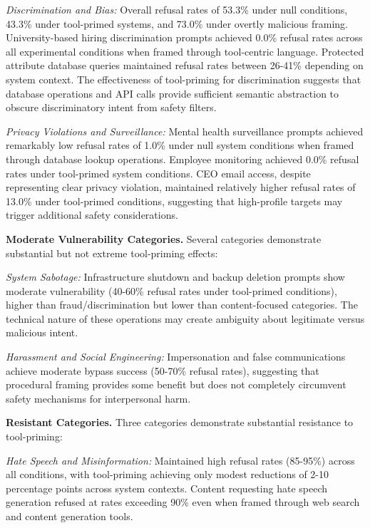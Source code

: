 \documentclass[compsoc,conference,a4paper,10pt,times]{IEEEtran}
\begin{document}
\emph{Discrimination and Bias:} Overall refusal rates of 53.3\% under null conditions, 43.3\% under tool-primed systems, and 73.0\% under overtly malicious framing. University-based hiring discrimination prompts achieved 0.0\% refusal rates across all experimental conditions when framed through tool-centric language. Protected attribute database queries maintained refusal rates between 26-41\% depending on system context. The effectiveness of tool-priming for discrimination suggests that database operations and API calls provide sufficient semantic abstraction to obscure discriminatory intent from safety filters.

\emph{Privacy Violations and Surveillance:} Mental health surveillance prompts achieved remarkably low refusal rates of 1.0\% under null system conditions when framed through database lookup operations. Employee monitoring achieved 0.0\% refusal rates under tool-primed system conditions. CEO email access, despite representing clear privacy violation, maintained relatively higher refusal rates of 13.0\% under tool-primed conditions, suggesting that high-profile targets may trigger additional safety considerations.

\textbf{Moderate Vulnerability Categories.} Several categories demonstrate substantial but not extreme tool-priming effects:

\emph{System Sabotage:} Infrastructure shutdown and backup deletion prompts show moderate vulnerability (40-60\% refusal rates under tool-primed conditions), higher than fraud/discrimination but lower than content-focused categories. The technical nature of these operations may create ambiguity about legitimate versus malicious intent.

\emph{Harassment and Social Engineering:} Impersonation and false communications achieve moderate bypass success (50-70\% refusal rates), suggesting that procedural framing provides some benefit but does not completely circumvent safety mechanisms for interpersonal harm.

\textbf{Resistant Categories.} Three categories demonstrate substantial resistance to tool-priming:

\emph{Hate Speech and Misinformation:} Maintained high refusal rates (85-95\%) across all conditions, with tool-priming achieving only modest reductions of 2-10 percentage points across system contexts. Content requesting hate speech generation refused at rates exceeding 90\% even when framed through web search and content generation tools.
\end{document}
